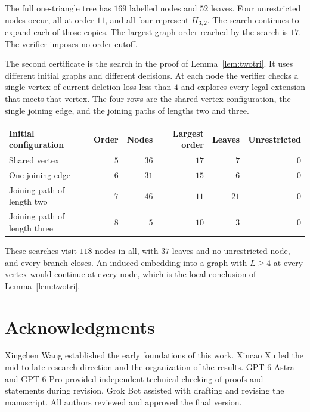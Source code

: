 \documentclass[ASNA]{USG}
\theoremstyle{WBstyletwo}
\numberwithin{equation}{section}
\begin{document}
The full one-triangle tree has $169$ labelled nodes and $52$ leaves. Four unrestricted nodes occur, all at order $11$, and all four represent $H_{3,2}$. The search continues to expand each of those copies. The largest graph order reached by the search is $17$. The verifier imposes no order cutoff.

The second certificate is the search in the proof of Lemma~\ref{lem:twotri}. It uses different initial graphs and different decisions. At each node the verifier checks a single vertex of current deletion loss less than $4$ and explores every legal extension that meets that vertex. The four rows are the shared-vertex configuration, the single joining edge, and the joining paths of lengths two and three.

\begin{center}
\begin{tabular}{@{}lrrrrr@{}}
\toprule
Initial configuration & Order & Nodes & Largest order & Leaves & Unrestricted\\
\midrule
Shared vertex & $5$ & $36$ & $17$ & $7$ & $0$\\
One joining edge & $6$ & $31$ & $15$ & $6$ & $0$\\
Joining path of length two & $7$ & $46$ & $11$ & $21$ & $0$\\
Joining path of length three & $8$ & $5$ & $10$ & $3$ & $0$\\
\bottomrule
\end{tabular}
\end{center}

These searches visit $118$ nodes in all, with $37$ leaves and no unrestricted node, and every branch closes. An induced embedding into a graph with $L\ge 4$ at every vertex would continue at every node, which is the local conclusion of Lemma~\ref{lem:twotri}.


\section*{Acknowledgments}
Xingchen Wang established the early foundations of this work. Xincao Xu led the mid-to-late research direction and the organization of the results. GPT-6 Astra and GPT-6 Pro provided independent technical checking of proofs and statements during revision. Grok Bot assisted with drafting and revising the manuscript. All authors reviewed and approved the final version.


\end{document}
